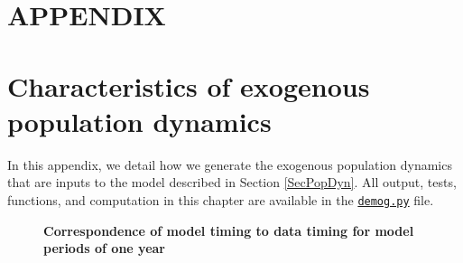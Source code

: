 \documentclass[letterpaper,12pt]{article}
\theoremstyle{definition}
\begin{document}
\newpage



\newpage
\renewcommand{\theequation}{A.\arabic{section}.\arabic{equation}}
\renewcommand{\thesection}{A-\arabic{section}}   %
\setcounter{equation}{0}                         %
\setcounter{section}{0}                          %
\section*{APPENDIX}                              %

\section{Characteristics of exogenous population dynamics}\label{AppPopDyn}

  In this appendix, we detail how we generate the exogenous population dynamics that are inputs to the model described in Section \ref{SecPopDyn}. All output, tests, functions, and computation in this chapter are available in the \href{https://github.com/rickecon/OG-USA/blob/demog/Python/ogusa/demog.py}{\texttt{demog.py}} file.

  \begin{figure}[htbp]\centering \captionsetup{width=4.0in}
    \caption{\label{FigPerTime}\textbf{Correspondence of model timing to data timing for model periods of one year}}
  \end{figure}
\end{document}
